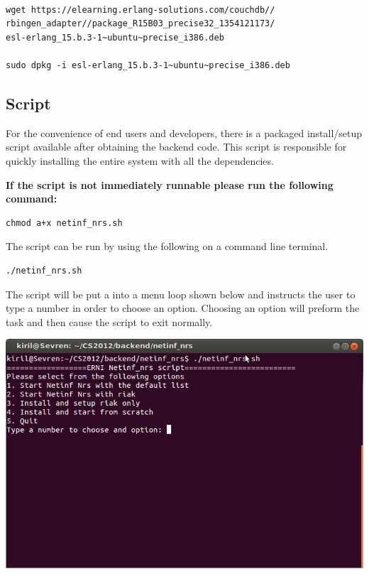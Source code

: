 \begin{verbatim}

wget https://elearning.erlang-solutions.com/couchdb//
rbingen_adapter//package_R15B03_precise32_1354121173/
esl-erlang_15.b.3-1~ubuntu~precise_i386.deb
 
sudo dpkg -i esl-erlang_15.b.3-1~ubuntu~precise_i386.deb

\end{verbatim}

\subsection{Script}
\label{backend-install-script}
For the convenience of end users and developers, there is a packaged install/setup script available after obtaining the backend code. 
This script is responsible for quickly installing the entire system with all the dependencies.

\textbf{If the script is not immediately runnable please run the following command:}
\begin{verbatim}
chmod a+x netinf_nrs.sh
\end{verbatim}

The script can be run by using the following on a command line terminal.

\begin{verbatim}
./netinf_nrs.sh
\end{verbatim}

The script will be put a into a menu loop shown below and instructs the user to type a number in order 
to choose an option. Choosing an option will preform the task and then cause the script to exit normally.

\includegraphics[scale=0.5]{./img/Backend_install_script.png}

